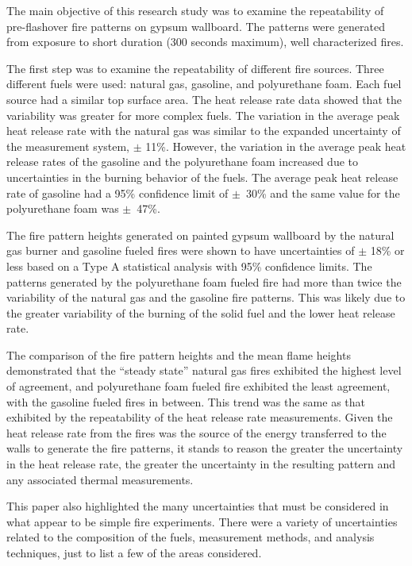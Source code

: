 \documentclass[twoside]{uocthesis}
\begin{document}
{The main objective of this research study was to examine the repeatability of pre-flashover fire patterns on gypsum wallboard.  The patterns were generated from exposure to short duration (300 seconds maximum), well characterized fires.  

The first step was to examine the repeatability of different fire sources.  Three different fuels were used: natural gas, gasoline, and polyurethane foam.  Each fuel source had a similar top surface area.  The heat release rate data showed that the variability was greater for more complex fuels.  The variation in the average peak heat release rate with the natural gas was similar to the expanded uncertainty of the measurement system, $\pm$ 11\%.  However, the variation in the average peak heat release rates of the gasoline and the polyurethane foam increased due to uncertainties in the burning behavior of the fuels.  The average peak heat release rate of gasoline had a 95\% confidence limit of $\pm$~30\% and the same value for the polyurethane foam was $\pm$~47\%.  

The fire pattern heights generated on painted gypsum wallboard by the natural gas burner and gasoline fueled fires were shown to have uncertainties of $\pm$ 18\% or less based on a Type A statistical analysis with 95\% confidence limits. The patterns generated by the polyurethane foam fueled fire had more than twice the variability of the natural gas and the gasoline fire patterns.  This was likely due to the greater variability of the burning of the solid fuel and the lower heat release rate.  

The comparison of the fire pattern heights and the mean flame heights demonstrated that the “steady state” natural gas fires exhibited the highest level of agreement, and polyurethane foam fueled fire exhibited the least agreement, with the gasoline fueled fires in between.  This trend was the same as that exhibited by the repeatability of the heat release rate measurements.  Given the heat release rate from the fires was the source of the energy transferred to the walls to generate the fire patterns, it stands to reason the greater the uncertainty in the heat release rate, the greater the uncertainty in the resulting pattern and any associated thermal measurements.  

This paper also highlighted the many uncertainties that must be considered in what appear to be simple fire experiments. There were a variety of uncertainties related to the composition of the fuels, measurement methods, and analysis techniques, just to list a few of the areas considered. 

}
\end{document}
